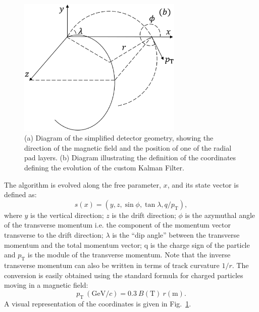 \begin{figure}[!ht]
         \centering
         \includegraphics[width=0.7\textwidth]{figures/ch4-KF_NDGArLite/Variables_Diagram_new.eps}
        \caption{(a) Diagram of the simplified detector geometry, showing the direction of the magnetic field and the position of one of the radial pad layers. (b) Diagram illustrating the definition of the coordinates defining the evolution of the custom Kalman Filter. } \label{fig:Detector_var}
\end{figure}


The algorithm is evolved along the free parameter, $x$, and its state vector is defined as:
\begin{equation}\label{eq:state}
    s(x) = \left(y,z,\sin{\phi},\tan{\lambda}, q/p_{\text{T}}\right),
\end{equation}
where $y$ is the vertical direction; $z$ is the drift direction; $\phi$ is the azymuthal angle of the transverse momentum i.e. the component of the momentum vector transverse to the drift direction; $\lambda$ is the ``dip angle''  between the transverse momentum and the total momentum vector; q is the charge sign of the particle and $p_{\text{T}}$ is the module of the transverse momentum. Note that the inverse transverse momentum can also be written in terms of track curvature $1/r$. The conversion is easily obtained using the standard formula for charged particles moving in a magnetic field:
\begin{equation}\label{eq:curvatureconv}
    p_{\text{T}} \ \left(\text{GeV}/c\right) =0.3 \ B \left(\text{T}\right) \ r \left(\text{m}\right).
\end{equation}
A visual representation of the coordinates is given in Fig.~\ref{fig:Detector_var}.

